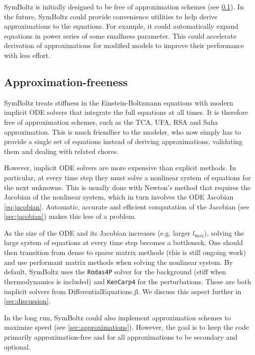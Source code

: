 \documentclass{aa}
\newcommand\lmax{l_\text{max}}
\begin{document}
SymBoltz is initially designed to be free of approximation schemes (see \cref{sec:approx-free}).
In the future, SymBoltz could provide convenience utilities to help derive approximations to the equations.
For example, it could automatically expand equations in power series of some smallness parameter.
This could accelerate derivation of approximations for modified models to improve their performance with less effort.

\subsection{Approximation-freeness}
\label{sec:approx-free}

SymBoltz treats stiffness in the Einstein-Boltzmann equations with modern implicit ODE solvers that integrate the full equations at all times.
It is therefore free of approximation schemes, such as the TCA, UFA, RSA and Saha approximation.
This is much friendlier to the modeler, who now simply has to provide a single set of equations instead of deriving approximations, validating them and dealing with related chores.

However, implicit ODE solvers are more expensive than explicit methods.
In particular, at every time step they must solve a nonlinear system of equations for the next unknowns.
This is usually done with Newton's method that requires the Jacobian of the nonlinear system, which in turn involves the ODE Jacobian \eqref{eq:jacobian}.
Automatic, accurate and efficient computation of the Jacobian (see \cref{sec:jacobian}) makes this less of a problem.

As the size of the ODE and its Jacobian increases (e.g. larger $\lmax$), solving the large system of equations at every time step becomes a bottleneck.
One should then transition from dense to sparse matrix methods (this is still ongoing work) and use performant matrix methods when solving the nonlinear system.
By default, SymBoltz uses the \texttt{Rodas4P} \citep{steinebachOrderreductionROWmethodsDAEs1995} solver for the background (stiff when thermodynamics is included) and \texttt{KenCarp4} \citep{kennedyAdditiveRungeKutta2003} for the perturbations.
These are both implicit solvers from DifferentialEquations.jl.
We discuss this aspect further in \cref{sec:discussion}.

In the long run, SymBoltz could also implement approximation schemes to maximize speed (see \cref{sec:approximations}).
However, the goal is to keep the code primarily approximation-free and for all approximations to be secondary and optional.
\end{document}

